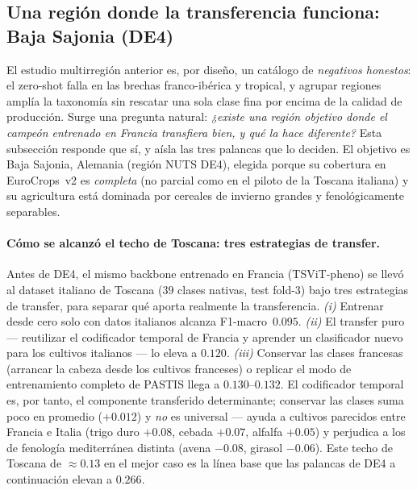 
\subsection{Una región donde la transferencia funciona: Baja Sajonia (DE4)}
\label{sec:de4}

El estudio multirregión anterior es, por diseño, un catálogo de
\emph{negativos honestos}: el zero-shot falla en las brechas
franco-ibérica y tropical, y agrupar regiones amplía la taxonomía sin
rescatar una sola clase fina por encima de la calidad de producción.
Surge una pregunta natural: \emph{¿existe una región objetivo donde el
campeón entrenado en Francia transfiera bien, y qué la hace diferente?}
Esta subsección responde que sí, y aísla las tres palancas que lo
deciden. El objetivo es Baja Sajonia, Alemania (región NUTS DE4),
elegida porque su cobertura en EuroCrops~v2 es \emph{completa} (no
parcial como en el piloto de la Toscana italiana) y su agricultura está
dominada por cereales de invierno grandes y fenológicamente separables.

\paragraph{Cómo se alcanzó el techo de Toscana: tres estrategias de transfer.}
Antes de DE4, el mismo backbone entrenado en Francia (TSViT-pheno) se llevó al
dataset italiano de Toscana ($39$ clases nativas, test fold-3) bajo tres
estrategias de transfer, para separar qué aporta realmente la transferencia.
\emph{(i)} Entrenar desde cero solo con datos italianos alcanza F1-macro~$0.095$.
\emph{(ii)} El transfer puro --- reutilizar el codificador temporal de Francia y
aprender un clasificador nuevo para los cultivos italianos --- lo eleva a $0.120$.
\emph{(iii)} Conservar las clases francesas (arrancar la cabeza desde los cultivos
franceses) o replicar el modo de entrenamiento completo de PASTIS llega a
$0.130$--$0.132$. El codificador temporal es, por tanto, el componente transferido
determinante; conservar las clases suma poco en promedio ($+0.012$) y \emph{no} es
universal --- ayuda a cultivos parecidos entre Francia e Italia (trigo duro $+0.08$,
cebada $+0.07$, alfalfa $+0.05$) y perjudica a los de fenología mediterránea distinta
(avena $-0.08$, girasol $-0.06$). Este techo de Toscana de $\approx0.13$ en el mejor
caso es la línea base que las palancas de DE4 a continuación elevan a $0.266$.

